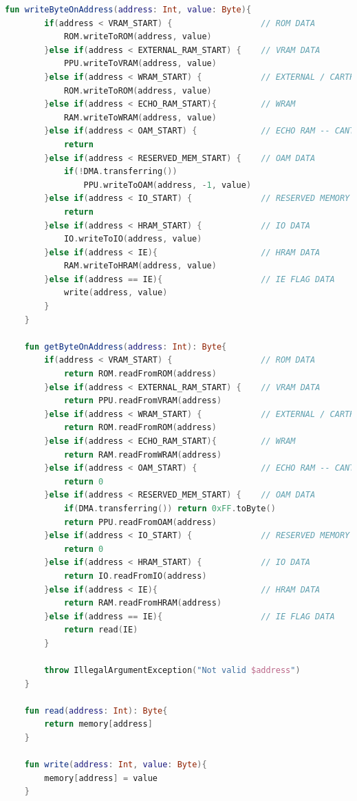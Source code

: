 \begin{lstlisting}[language=Kotlin, caption={Métodos de lectura y escritura en memoria}, label={code:kotlinmemrw}]
    fun writeByteOnAddress(address: Int, value: Byte){
        if(address < VRAM_START) {                  // ROM DATA
            ROM.writeToROM(address, value)
        }else if(address < EXTERNAL_RAM_START) {    // VRAM DATA
            PPU.writeToVRAM(address, value)
        }else if(address < WRAM_START) {            // EXTERNAL / CARTRIDGE RAM DATA
            ROM.writeToROM(address, value)
        }else if(address < ECHO_RAM_START){         // WRAM
            RAM.writeToWRAM(address, value)
        }else if(address < OAM_START) {             // ECHO RAM -- CANT BE USED !
            return
        }else if(address < RESERVED_MEM_START) {    // OAM DATA
            if(!DMA.transferring())
                PPU.writeToOAM(address, -1, value)
        }else if(address < IO_START) {              // RESERVED MEMORY - CANT BE USED !
            return
        }else if(address < HRAM_START) {            // IO DATA
            IO.writeToIO(address, value)
        }else if(address < IE){                     // HRAM DATA
            RAM.writeToHRAM(address, value)
        }else if(address == IE){                    // IE FLAG DATA
            write(address, value)
        }
    }

    fun getByteOnAddress(address: Int): Byte{
        if(address < VRAM_START) {                  // ROM DATA
            return ROM.readFromROM(address)
        }else if(address < EXTERNAL_RAM_START) {    // VRAM DATA
            return PPU.readFromVRAM(address)
        }else if(address < WRAM_START) {            // EXTERNAL / CARTRIDGE RAM DATA
            return ROM.readFromROM(address)
        }else if(address < ECHO_RAM_START){         // WRAM
            return RAM.readFromWRAM(address)
        }else if(address < OAM_START) {             // ECHO RAM -- CANT BE USED !
            return 0
        }else if(address < RESERVED_MEM_START) {    // OAM DATA
            if(DMA.transferring()) return 0xFF.toByte()
            return PPU.readFromOAM(address)
        }else if(address < IO_START) {              // RESERVED MEMORY - CANT BE USED !
            return 0
        }else if(address < HRAM_START) {            // IO DATA
            return IO.readFromIO(address)
        }else if(address < IE){                     // HRAM DATA
            return RAM.readFromHRAM(address)
        }else if(address == IE){                    // IE FLAG DATA
            return read(IE)
        }

        throw IllegalArgumentException("Not valid $address")
    }

    fun read(address: Int): Byte{
        return memory[address]
    }

    fun write(address: Int, value: Byte){
        memory[address] = value
    }
\end{lstlisting}

